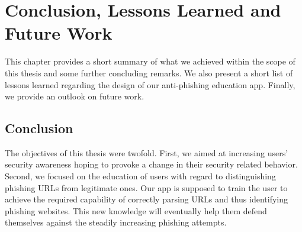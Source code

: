 
\section{Conclusion, Lessons Learned and Future Work}
\label{s:conclusion}

This chapter provides a short summary of what we achieved within the scope of this thesis and some further concluding remarks.
We also present a short list of lessons learned regarding the design of our anti-phishing education app.
Finally, we provide an outlook on future work.
\subsection{Conclusion}
The objectives of this thesis were twofold.
First, we aimed at increasing users' security awareness hoping to provoke a change in their security related behavior.
Second, we focused on the education of users with regard to distinguishing phishing URLs from legitimate ones. 
Our app is supposed to train the user to achieve the required capability of correctly parsing URLs and thus identifying phishing websites.
This new knowledge will eventually help them defend themselves against the steadily increasing phishing attempts.

